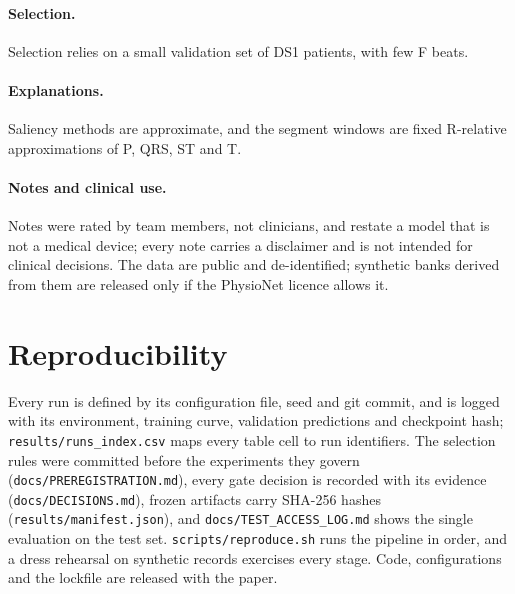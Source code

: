 \documentclass[11pt]{article}
\begin{document}
\paragraph{Selection.} Selection relies on a small validation set of DS1 patients, with few F beats.
\paragraph{Explanations.} Saliency methods are approximate, and the segment windows are fixed R-relative
approximations of P, QRS, ST and T.
\paragraph{Notes and clinical use.} Notes were rated by team members, not clinicians, and restate a model that is
not a medical device; every note carries a disclaimer and is not intended for clinical decisions. The data are
public and de-identified; synthetic banks derived from them are released only if the PhysioNet licence allows it.

\section{Reproducibility}
Every run is defined by its configuration file, seed and git commit, and is logged with its environment,
training curve, validation predictions and checkpoint hash; \texttt{results/runs\_index.csv} maps every table cell
to run identifiers. The selection rules were committed before the experiments they govern
(\texttt{docs/PREREGISTRATION.md}), every gate decision is recorded with its evidence
(\texttt{docs/DECISIONS.md}), frozen artifacts carry SHA-256 hashes (\texttt{results/manifest.json}), and
\texttt{docs/TEST\_ACCESS\_LOG.md} shows the single evaluation on the test set. \texttt{scripts/reproduce.sh} runs the
pipeline in order, and a dress rehearsal on synthetic records exercises every stage. Code, configurations and the
lockfile are released with the paper.



\end{document}
